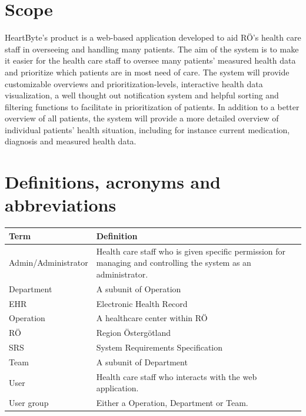 \documentclass{scrreprt}
\begin{document}
\section{Scope}
HeartByte's product is a web-based application developed to aid RÖ's health care staff in overseeing and handling many patients. The aim of the system is to make it easier for the health care staff to oversee many patients' measured health data and prioritize which patients are in most need of care. The system will provide customizable overviews and prioritization-levels, interactive health data visualization, a well thought out notification system and helpful sorting and filtering functions to facilitate in prioritization of patients. In addition to a better overview of all patients, the system will provide a more detailed overview of individual patients' health situation, including for instance current medication, diagnosis and measured health data.


\section{Definitions, acronyms and abbreviations}
\label{section:def}
\begin{center}
\begin{tabularx}{\linewidth}{| l | X |}
 \hline
 \textbf{Term} & \textbf{Definition} \\ 
 \hline
   Admin/Administrator & Health care staff who is given specific permission for managing and controlling the system as an administrator.  \\ 
  \hline
    Department & A subunit of Operation \\
  \hline
   EHR & Electronic Health Record \\ 
   \hline
      Operation & A healthcare center within RÖ \\ 
  \hline
    RÖ  & Region Östergötland  \\ 
  \hline
    SRS & System Requirements Specification \\
  \hline
    Team & A subunit of Department \\ 
  \hline
  User  & Health care staff who interacts with the web application.  \\
  \hline
  User group & Either a Operation, Department or Team. \\ 
  \hline
\end{tabularx}
\end{center}
\end{document}
